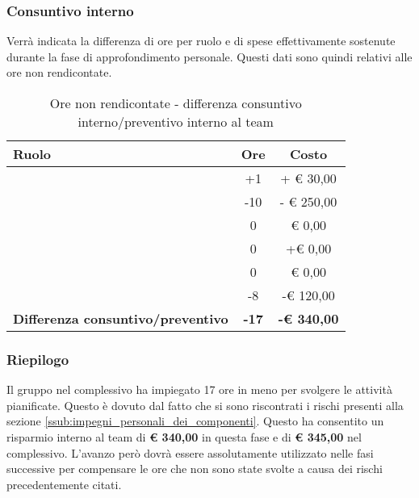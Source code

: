 		\subsubsection{Consuntivo interno} %
		\label{ssub:consuntivo}
		Verrà indicata la differenza di ore per ruolo e di spese effettivamente sostenute durante la fase di approfondimento personale. Questi dati sono quindi relativi alle ore non rendicontate. \newline
		\begin{table}[!h]
			\begin{center}
				\begin{tabularx}{0.75\textwidth}{|X|c|c|}
					\hline
					\textbf{Ruolo} & \textbf{Ore} & \textbf{Costo} \\
					\hline
					\roleProjectManager & +1 & + \euro{} 30,00 \\
					\hline
					\roleAnalyst & -10 & - \euro{} 250,00 \\
					\hline
					\roleDesigner & 0 & \euro{} 0,00 \\
					\hline
					\roleAdministrator & 0  & +\euro{} 0,00 \\
					\hline
					\roleProgrammer & 0 & \euro{} 0,00 \\
					\hline
					\roleVerifier & -8 & -\euro{} 120,00 \\
					\hline
					\textbf{Differenza consuntivo/preventivo} & \textbf{-17} & \textbf{-\euro{} 340,00} \\
					\hline
				\end{tabularx}
			\end{center}
		\caption{Ore non rendicontate - differenza consuntivo interno/preventivo interno al team}
		\end{table}

		\subsubsection{Riepilogo} %
		\label{ssub:riepilogo}
		Il gruppo nel complessivo ha impiegato 17 ore in meno per svolgere le attività pianificate. Questo è dovuto dal fatto che si sono riscontrati i rischi presenti alla sezione \ref{ssub:impegni_personali_dei_componenti}. \newline
		Questo ha consentito un risparmio interno al team di \textbf{\euro{} 340,00} in questa fase e di \textbf{\euro{} 345,00} nel complessivo. L'avanzo però dovrà essere assolutamente utilizzato nelle fasi successive per compensare le ore che non sono state svolte a causa dei rischi precedentemente citati.
